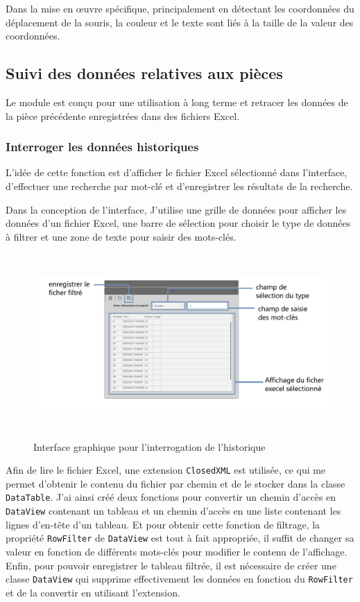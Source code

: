 Dans la mise en œuvre spécifique, principalement en détectant les coordonnées du déplacement de la souris, la couleur et le texte sont liés à la taille de la valeur des coordonnées.


\newpage
\subsection{Suivi des données relatives aux pièces}
Le module est conçu pour une utilisation à long terme et retracer les données de la pièce précédente enregistrées dans des fichiers \gls{Excel}. 

\subsubsection{Interroger les données historiques}
L'idée de cette fonction est d'afficher le fichier Excel sélectionné dans l'interface, d'effectuer une recherche par mot-clé et d'enregistrer les résultats de la recherche. 

Dans la conception de l'interface, J'utilise une grille de données pour afficher les données d'un fichier Excel, une barre de sélection pour choisir le type de données à filtrer et une zone de texte pour saisir des mots-clés. 
\begin{figure}[H]
    \centering
    \includegraphics[height=7cm]{ressources/images/information_search.png}
    \caption{Interface graphique pour l'interrogation de l'historique }
\end{figure}

Afin de lire le fichier Excel, une extension \texttt{ClosedXML} est utilisée, ce qui me permet d'obtenir le contenu du fichier par chemin et de le stocker dans la classe \texttt{DataTable}.  J'ai ainsi créé deux fonctions pour convertir un chemin d'accès en \texttt{DataView} contenant un tableau et un chemin d'accès en une liste contenant les lignes d'en-tête d'un tableau. Et pour obtenir cette fonction de filtrage, la propriété \texttt{RowFilter} de \texttt{DataView} est tout à fait appropriée, il suffit de changer sa valeur en fonction de différents mots-clés pour modifier le contenu de l'affichage. Enfin, pour pouvoir enregistrer le tableau filtrée, il est nécessaire de créer une classe \texttt{DataView} qui supprime effectivement les données en fonction du \texttt{RowFilter} et de la convertir en utilisant l'extension. 


